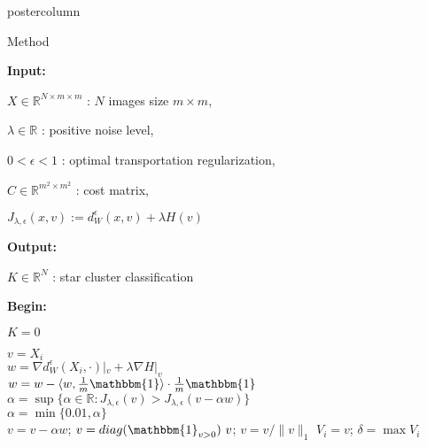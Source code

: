\documentclass{beamer}
\newcommand{\R}{{\mathbb{R}}}
\newcommand{\bbI}{{\mathbbm{1}}}
\begin{document}
\begin{frame}
\begin{columns}
\begin{column}{.5\textwidth}
\begin{beamercolorbox}[center]{postercolumn}
\begin{minipage}{.98\textwidth}
{\begin{myblock}{Method}
    
    
  	
  	
  	
  	

\begin{algorithm}[H]
    \textbf{Input:} 

$X \in \R^{N \times m \times m}$ : $N$ images size $m \times m$,

$\lambda \in \R$ : positive noise level,

$0 < \epsilon < 1$ : optimal transportation regularization,

$C\in\R^{m^2 \times m^2}$ : cost matrix,

$ J_{\lambda,\epsilon}(x,v) := d_W^\epsilon(x,v) + \lambda H(v) $

    \textbf{Output:}

$K \in \R^N$ : star cluster classification
    
    \textbf{Begin:}
    
    $K = 0$
    
 	{
        $ v = X_i $ \\
 	    {
$w = \nabla d_W^\epsilon(X_i,\cdot)|_v + \lambda \nabla H|_v $ \\
$ w = w - \langle w, \frac{1}{m} \bbI \rangle \cdot \frac{1}{m} \bbI $ \\
$ \alpha = \sup\{\alpha \in \R : J_{\lambda,\epsilon}(v) > J_{\lambda,\epsilon}(v - \alpha w) \}$ \\
            $ \alpha = \min\{0.01, \alpha\}$\\
 	        $ v = v - \alpha w $;
 	        $ v = diag(\bbI_{v > 0}) \ v $;
 	        $ v = v/\|v\|_1 $
 	    }
 	    $V_i = v$;
     	$\delta = \max V_i$
     	
}
\end{algorithm}
\end{myblock}}
\end{minipage}
\end{beamercolorbox}
\end{column}
\end{columns}
\end{frame}
\end{document}
